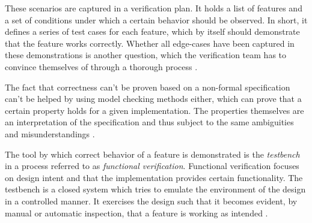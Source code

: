 \documentclass[11pt]{report}
\begin{document}
These scenarios are captured in a verification plan. It holds a list of features and a set of conditions under which
a certain behavior should be observed. In short, it defines a series of test cases for each feature, which by itself
should demonstrate that the feature works correctly. Whether all edge-cases have been captured in these
demonstrations is another question, which the verification team has to convince themselves of through a thorough
process \cite[Ch. 1]{bergeron2012writing}.

The fact that correctness can't be proven based on a non-formal specification can't be helped by using model checking
methods either, which can prove that a certain property holds for a given implementation. The properties themselves
are an interpretation of the specification and thus subject to the same ambiguities and misunderstandings \cite[Ch.
1]{bergeron2012writing}.

The tool by which correct behavior of a feature is demonstrated is the \textit{testbench} in a process referred to as
\textit{functional verification}. Functional verification focuses on design intent and that the implementation
provides certain functionality. The testbench is a closed system which tries to emulate the environment of the design
in a controlled manner. It exercises the design such that it becomes evident, by manual or automatic inspection, that
a feature is working as intended \cite[Ch. 1]{bergeron2012writing}.
\end{document}
